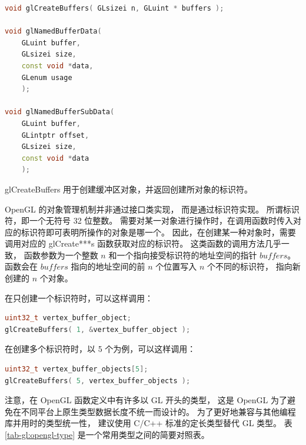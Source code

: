 \documentclass[fontset=windows]{ctexart}
\begin{document}
\begin{lstlisting}[language=c++]
void glCreateBuffers( GLsizei n, GLuint * buffers );

void glNamedBufferData(
    GLuint buffer,
    GLsizei size,
    const void *data,
    GLenum usage
    );

void glNamedBufferSubData(
    GLuint buffer,
    GLintptr offset,
    GLsizei size,
    const void *data
    );
\end{lstlisting}

glCreateBuffers 用于创建缓冲区对象，并返回创建所对象的标识符。

OpenGL 的对象管理机制并非通过接口类实现，
而是通过标识符实现。
所谓标识符，即一个无符号 32 位整数。
需要对某一对象进行操作时，在调用函数时传入对应的标识符即可表明所操作的对象是哪一个。
因此，在创建某一种对象时，需要调用对应的 glCreate***s 函数获取对应的标识符。
这类函数的调用方法几乎一致，
函数参数为一个整数 $n$ 和一个指向接受标识符的地址空间的指针 $buffers$。
函数会在 $buffers$ 指向的地址空间的前 $n$ 个位置写入 $n$ 个不同的标识符，
指向新创建的 $n$ 个对象。

在只创建一个标识符时，可以这样调用：

\begin{lstlisting}[language=c++]
uint32_t vertex_buffer_object;
glCreateBuffers( 1, &vertex_buffer_object );
\end{lstlisting}

在创建多个标识符时，以 5 个为例，可以这样调用：

\begin{lstlisting}[language=c++]
uint32_t vertex_buffer_objects[5];
glCreateBuffers( 5, vertex_buffer_objects );
\end{lstlisting}

注意，在 OpenGL 函数定义中有许多以 GL 开头的类型，
这是 OpenGL 为了避免在不同平台上原生类型数据长度不统一而设计的。
为了更好地兼容与其他编程库并用时的类型统一性，
建议使用 C/C++ 标准的定长类型替代 GL 类型。
表 \ref{tab-gl:opengl-type} 是一个常用类型之间的简要对照表。
\end{document}
